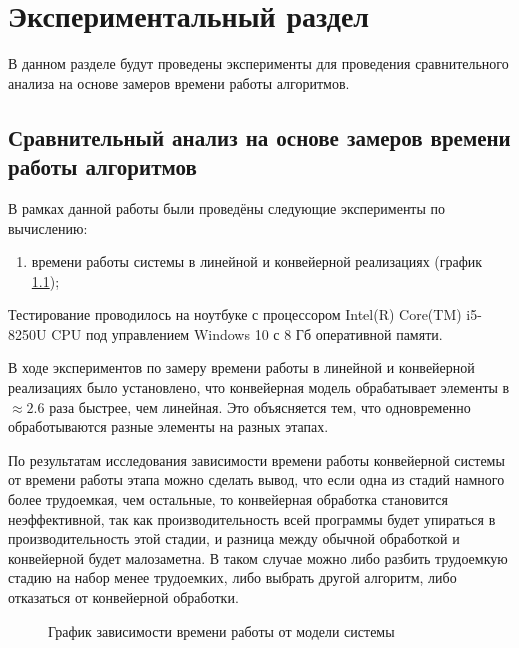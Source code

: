\chapter{Экспериментальный раздел}
\label{cha:research}
    В данном разделе будут проведены эксперименты для проведения 
    сравнительного анализа на основе замеров времени работы алгоритмов.

    \section{Сравнительный анализ на основе замеров времени работы алгоритмов}
        В рамках данной работы были проведёны следующие эксперименты по вычислению: 
        \begin{enumerate}
            \item времени работы системы в линейной и конвейерной реализациях (график \ref{graph:test:models});
        \end{enumerate}

        Тестирование проводилось на ноутбуке с процессором
        Intel(R) Core(TM) i5-8250U CPU \cite{proc}
        под управлением Windows 10 с 8 Гб оперативной памяти.

        В ходе экспериментов по замеру времени работы в линейной и конвейерной реализациях было установлено,
        что конвейерная модель обрабатывает элементы в $ \approx 2.6 $ раза
        быстрее, чем линейная. Это объясняется тем,
        что одновременно обработываются разные элементы на разных этапах.
        
        По результатам исследования зависимости времени работы конвейерной системы от времени работы этапа  
        можно сделать вывод, что если одна из стадий намного более трудоемкая, чем остальные,
        то конвейерная обработка становится неэффективной,
        так как производительность всей программы будет упираться в производительность этой стадии,
        и разница между обычной обработкой и конвейерной будет малозаметна.
        В таком случае можно либо разбить трудоемкую стадию на набор менее трудоемких,
        либо выбрать другой алгоритм, либо отказаться от конвейерной обработки.


    \begin{figure}[h!]
        \centering
        \caption{График зависимости времени работы от модели системы} 
        \label{graph:test:models}
    \end{figure}


\newpage